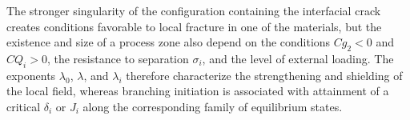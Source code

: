 The stronger singularity of the configuration containing the interfacial
crack creates conditions favorable to local fracture in one of the
materials, but the existence and size of a process zone also depend on
the conditions $Cg_2<0$ and $CQ_i>0$, the resistance to separation
$\sigma_i$, and the level of external loading. The exponents
$\lambda_0$, $\lambda$, and $\lambda_i$ therefore characterize the
strengthening and shielding of the local field, whereas branching
initiation is associated with attainment of a critical $\delta_i$ or
$J_i$ along the corresponding family of equilibrium states.
